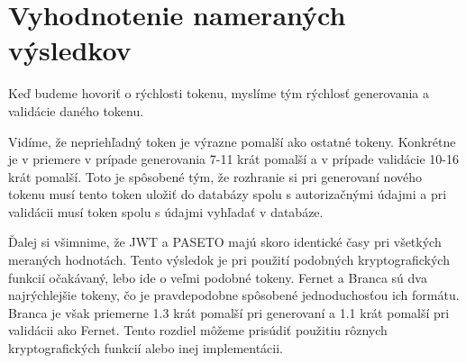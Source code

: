 \begin{table}
  \begin{center}
    \caption{Kryptografické funkcie na podpisovanie a šifrovanie tokenov}
    \label{tab:api_porovnanie} %

  \end{center}
\end{table}

\section{Vyhodnotenie nameraných výsledkov}

Keď budeme hovoriť o rýchlosti tokenu, myslíme tým rýchlosť generovania a validácie daného tokenu. 

Vidíme, že nepriehľadný token je výrazne pomalší ako ostatné tokeny. Konkrétne je v priemere v prípade generovania 7-11 krát pomalší a v prípade validácie 10-16 krát pomalší. Toto je spôsobené tým, že rozhranie si pri generovaní nového tokenu musí tento token uložiť do databázy spolu s autorizačnými údajmi a pri validácii musí token spolu s údajmi vyhľadať v databáze.

Ďalej si všimnime, že JWT a PASETO majú skoro identické časy pri všetkých meraných hodnotách. Tento výsledok je pri použití podobných kryptografických funkcií očakávaný, lebo ide o veľmi podobné tokeny. Fernet a Branca sú dva najrýchlejšie tokeny, čo je pravdepodobne spôsobené jednoduchosťou ich formátu. Branca je však priemerne 1.3 krát pomalší pri generovaní a 1.1 krát pomalší pri validácii ako Fernet. Tento rozdiel môžeme prisúdiť použitiu rôznych kryptografických funkcií alebo inej implementácii.

